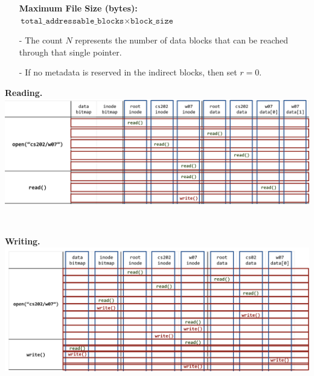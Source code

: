 \documentclass[8pt]{extarticle}
\begin{document}
\begin{minipage}[htp]{0.5\textwidth}
\begin{minipage}[htp]{0.68\textwidth}
\begin{itemize}[noitemsep,nolistsep,topsep=0px,partopsep=0pt,parsep=0pt]
    
    \item[] \textbf{Maximum File Size (bytes):} \\ 
$
    \texttt{total\_addressable\_blocks} \times \texttt{block\_size}
$
    \item[-] The count \(N\) represents the number of data blocks that can be reached through that single pointer.
    \item[-] If no metadata is reserved in the indirect blocks, then set \(r = 0\).
\end{itemize}
\end{minipage}
\begin{minipage}[htp]{1\textwidth}
    \noindent\textbf{Reading.}\\
    \includegraphics[width=1\textwidth]{images/read.png}
\end{minipage}\\
\begin{minipage}[htp]{1\textwidth}
    \noindent\textbf{Writing.}\\
    \includegraphics[width=1\textwidth]{images/write.png}
\end{minipage}
\end{minipage}
\newpage
\noindent
\hspace{-5px}
\end{document}
